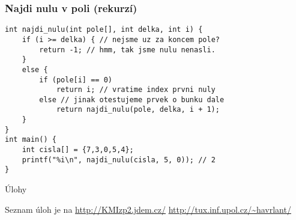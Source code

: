 \documentclass{beamer}
\begin{document}
\begin{frame}[t,fragile]\frametitle{Najdi nulu v poli (rekurzí)} 
\begin{verbatim} 
int najdi_nulu(int pole[], int delka, int i) {
    if (i >= delka) { // nejsme uz za koncem pole?
        return -1; // hmm, tak jsme nulu nenasli.
    }
    else {
        if (pole[i] == 0) 
            return i; // vratime index prvni nuly
        else // jinak otestujeme prvek o bunku dale
            return najdi_nulu(pole, delka, i + 1);
    }
}
int main() {
    int cisla[] = {7,3,0,5,4};
    printf("%i\n", najdi_nulu(cisla, 5, 0)); // 2
}
\end{verbatim}
\end{frame}



\begin{frame}[t,fragile]{Úlohy}
\begin{center}
\vskip 1cm
{\Large Seznam úloh je na \url{http://KMIzp2.jdem.cz/}}
\vskip 2cm
\url{http://tux.inf.upol.cz/~havrlant/}
\end{center}
\end{frame}
\end{document}
